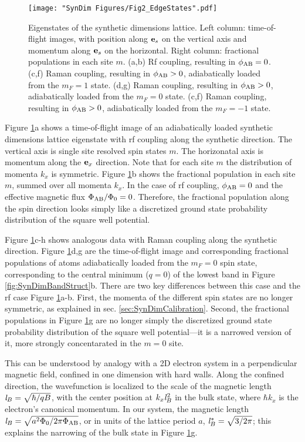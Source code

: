 \begin{figure}
	\texttt{[image: "SynDim Figures/Fig2\_EdgeStates".pdf]}
\caption{Eigenstates of the synthetic dimensions lattice. Left column: time-of-flight images, with position along ${\bf e}_s$ on the vertical axis and momentum along ${\bf e}_s$ on the horizontal. Right column: fractional populations in each site $m$.  (a,b) Rf coupling, resulting in $\phi_{\rm AB}=0$. (c,f) Raman coupling, resulting in $\phi_{\rm AB}>0$, adiabatically loaded from the $m_F=1$ state.  (d,g) Raman coupling, resulting in $\phi_{\rm AB}>0$, adiabatically loaded from the $m_F=0$ state. (c,f) Raman coupling, resulting in $\phi_{\rm AB}>0$, adiabatically loaded from the $m_F=-1$ state.}
\label{fig:TOFeigenstates}
\end{figure}

Figure \ref{fig:TOFeigenstates}a shows a time-of-flight image of an adiabatically loaded synthetic dimensions lattice eigenstate with rf coupling along the synthetic direction. The vertical axis is single site resolved spin states $m$. The horizonatal axis is momentum along the ${\bf e}_x$ direction. Note that for each site $m$ the distribution of momenta $k_x$ is symmetric. Figure \ref{fig:TOFeigenstates}b shows the fractional population in each site $m$, summed over all momenta $k_x$.  In the case of rf coupling, $\phi_{\rm AB}=0$ and the effective magnetic flux $\Phi_{\rm AB}/\Phi_0=0$.  Therefore, the fractional population along the spin direction looks simply like a discretized ground state probability distribution of the square well potential.

Figure \ref{fig:TOFeigenstates}c-h shows analogous data with Raman coupling along the synthetic direction. Figure \ref{fig:TOFeigenstates}d,g are the time-of-flight image and corresponding fractional populations of atoms adiabatically loaded from the $m_F=0$ spin state, corresponding to the central minimum ($q=0$) of the lowest band in Figure \ref{fig:SynDimBandStruct}b. There are two key differences between this case and the rf case Figure \ref{fig:TOFeigenstates}a-b. First, the momenta of the different spin states are no longer symmetric, as explained in sec. \ref{sec:SynDimCalibration}. Second, the fractional populations in Figure \ref{fig:TOFeigenstates}g are no longer simply the discretized ground state probability distribution of the square well potential---it is a narrowed version of it, more strongly concentarated in the $m=0$ site. 

This can be understood by analogy with a 2D electron system in a perpendicular magnetic field, confined in one dimension with hard walls. Along the confined direction, the wavefunction is localized to the scale of the magnetic length ${\it l}_B=\sqrt{\hbar/qB}$, with the center position at $k_x {\it l}_B^2$ in the bulk state, where $\hbar k_x$ is the electron’s canonical momentum. In our system, the magnetic length${\it l}_B=\sqrt{a^2 \Phi_0/2\pi\Phi_{\rm AB}}$, or in units of the lattice period $a$, ${\it l}^*_B=\sqrt{3/2\pi}$; this explains the narrowing of the bulk state in Figure \ref{fig:TOFeigenstates}g.

